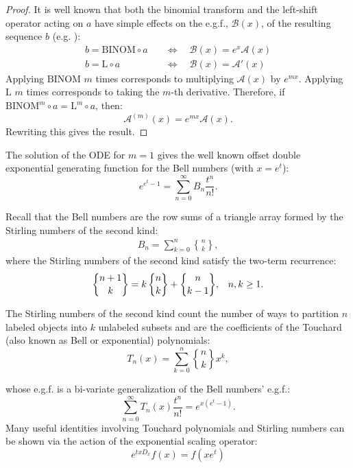 \documentclass[a4paper]{amsart}
\begin{document}
\begin{proof}
It is well known that both the binomial transform and the left-shift operator acting on $a$ have simple effects on the e.g.f., $\mathcal{B}(x)$, of the resulting sequence $b$ (e.g. \cite{bernstein1995}):
\begin{equation}\label{eq-egf-transform}
\begin{aligned}
b = \mathrm{BINOM} \circ a \quad &\iff\quad \mathcal{B}(x) = e^x \mathcal{A}(x) \\
b = \mathrm{L} \circ a \quad &\iff\quad \mathcal{B}(x) = \mathcal{A}'(x)
\end{aligned}
\end{equation}
Applying $\mathrm{BINOM}$ $m$ times corresponds to multiplying $\mathcal{A}(x)$ by $e^{mx}$. Applying $\mathrm{L}$ $m$ times corresponds to taking the $m$-th derivative. Therefore, if \(\mathrm{BINOM}^m \circ a = \mathrm{L}^m \circ a\), then:
\[
\mathcal{A}^{(m)}(x) = e^{mx} \mathcal{A}(x).
\]
Rewriting this gives the result.
\end{proof}

The solution of the ODE for $m=1$ gives the well known offset double exponential generating function for the Bell numbers (with $x = e^t$):
\begin{equation}\label{eq-bell-egf}
    e^{e^t-1} = \sum_{n=0}^{\infty} B_n \frac{t^n}{n!}.
\end{equation}

Recall that the Bell numbers are the row sums of a triangle array formed by the Stirling numbers of the second kind:
\begin{align*}
B_n = \sum_{k=0}^{n}\genfrac\{\}{0pt}{}{n}{k},
\end{align*}
where the Stirling numbers of the second kind satisfy the two-term recurrence:
\[
\genfrac\{\}{0pt}{}{n+1}{k} = k \, \genfrac\{\}{0pt}{}{n}{k} + \genfrac\{\}{0pt}{}{n}{k-1}, \,\,\,\,\, n, k \ge 1\\.
\]

The Stirling numbers of the second kind count the number of ways to partition $n$ labeled objects into $k$ unlabeled subsets and are the coefficients of the Touchard (also known as Bell or exponential) polynomials:
\begin{equation}\label{eq-touchard-def}
    T_n(x) = \sum_{k=0}^{n} \genfrac\{\}{0pt}{}{n}{k} x^k,
\end{equation}

whose e.g.f. is a bi-variate generalization of the Bell numbers' e.g.f.:
\begin{equation}\label{eq-touchard-egf}
    \sum_{n=0}^{\infty} T_n(x) \frac{t^n}{n!} = e^{x(e^t-1)}.
\end{equation}
Many useful identities involving Touchard polynomials and Stirling numbers can be shown via the action of the exponential scaling operator:
\begin{equation}\label{eq-scaling-operator}
    e^{txD_x}f(x)=f(xe^t)
\end{equation}
\end{document}
